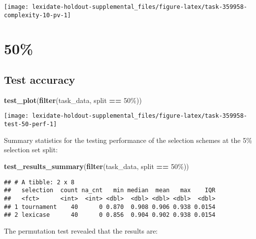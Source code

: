 \documentclass[
]{book}
\newenvironment{Shaded}{\begin{snugshade}}{\end{snugshade}}
\newcommand{\FunctionTok}[1]{\textcolor[rgb]{0.13,0.29,0.53}{\textbf{#1}}}
\newcommand{\NormalTok}[1]{#1}
\newcommand{\SpecialCharTok}[1]{\textcolor[rgb]{0.81,0.36,0.00}{\textbf{#1}}}
\newcommand{\StringTok}[1]{\textcolor[rgb]{0.31,0.60,0.02}{#1}}
\begin{document}
\texttt{[image: lexidate-holdout-supplemental\_files/figure-latex/task-359958-complexity-10-pv-1]}

\hypertarget{section-32}{%
\section{50\%}\label{section-32}}

\hypertarget{test-accuracy-32}{%
\subsection{Test accuracy}\label{test-accuracy-32}}

\begin{Shaded}
\begin{Highlighting}[]
\FunctionTok{test\_plot}\NormalTok{(}\FunctionTok{filter}\NormalTok{(task\_data, split }\SpecialCharTok{==} \StringTok{\textquotesingle{}50\%\textquotesingle{}}\NormalTok{))}
\end{Highlighting}
\end{Shaded}

\texttt{[image: lexidate-holdout-supplemental\_files/figure-latex/task-359958-test-50-perf-1]}

Summary statistics for the testing performance of the selection schemes at the 5\% selection set split:

\begin{Shaded}
\begin{Highlighting}[]
\FunctionTok{test\_results\_summary}\NormalTok{(}\FunctionTok{filter}\NormalTok{(task\_data, split }\SpecialCharTok{==} \StringTok{\textquotesingle{}50\%\textquotesingle{}}\NormalTok{))}
\end{Highlighting}
\end{Shaded}

\begin{verbatim}
## # A tibble: 2 x 8
##   selection  count na_cnt   min median  mean   max    IQR
##   <fct>      <int>  <int> <dbl>  <dbl> <dbl> <dbl>  <dbl>
## 1 tournament    40      0 0.870  0.908 0.906 0.938 0.0154
## 2 lexicase      40      0 0.856  0.904 0.902 0.938 0.0154
\end{verbatim}

The permutation test revealed that the results are:
\end{document}
